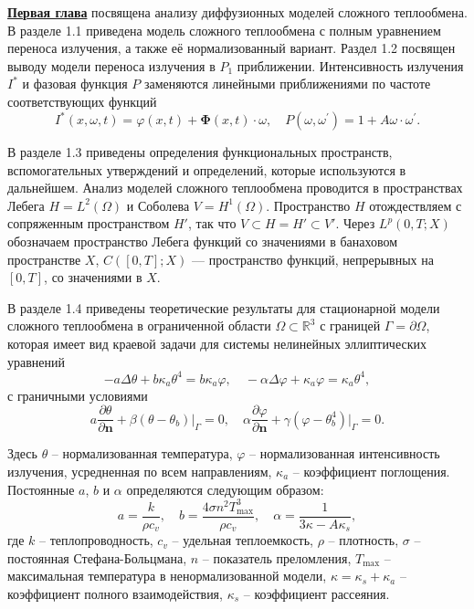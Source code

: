 \underline{\textbf{Первая глава}} посвящена анализу
диффузионных моделей сложного теплообмена.
В разделе 1.1 приведена модель сложного теплообмена с
полным уравнением переноса излучения, а также её нормализованный вариант.
Раздел 1.2 посвящен выводу модели переноса излучения в
$P_1$ приближении.
Интенсивность излучения $I^{*}$ и фазовая функция $P$ заменяются линейными приближениями
по частоте соответствующих функций
\[
    I^{*}(x, \omega, t) = \varphi(x, t)
    +\boldsymbol{\Phi}(x, t) \cdot \omega, \quad
    P\left(\omega, \omega^{\prime}\right)= 1
    + A \omega \cdot \omega^{\prime}.
\]


В разделе 1.3 приведены определения функциональных пространств,
вспомогательных утверждений и определений,
которые используются в дальнейшем.
Анализ моделей сложного теплообмена проводится в пространствах Лебега
$H = L^2(\Omega)$ и Соболева $V = H^1(\Omega)$.
Пространство $H$ отождествляем с сопряженным пространством $H'$,
так что $V \subset H = H' \subset V'$.
Через $L^p(0, T; X)$ обозначаем пространство Лебега функций
со значениями в банаховом пространстве $X$, $C([0, T]; X)$ — пространство
функций, непрерывных на $[0, T]$, со значениями в $X$.


В разделе 1.4 приведены теоретические результаты для
стационарной модели сложного теплообмена
в ограниченной области $\Omega \subset \mathbb{R}^3$ с границей $\Gamma=\partial \Omega$,
которая имеет вид краевой задачи для системы нелинейных эллиптических уравнений
\begin{equation}
    \label{eq:1_4:4-1}
    -a \Delta \theta + b \kappa_a \theta^4 =  b \kappa_a \varphi, \quad
    - \alpha \Delta \varphi + \kappa_a \varphi = \kappa_a \theta^4,
\end{equation}
с граничными условиями
\begin{equation}
    \label{eq:1_4:4-4}
    a \frac{\partial \theta}{\partial \mathbf{n}}
    +\left.\beta\left(\theta-\theta_{b}\right)\right|_{\Gamma}=0, \quad
    \alpha \frac{\partial \varphi}{\partial \mathbf{n}}
    + \gamma (\varphi-\theta_b^4)|_{\Gamma} = 0.
\end{equation}


Здесь $\theta$ -- нормализованная температура, $\varphi$ --
нормализованная интенсивность излучения, усредненная по всем
направлениям, $\kappa_a$ -- коэффициент поглощения.
Постоянные $a$, $b$ и $\alpha$ определяются следующим образом:
\[
    a=\frac{k}{\rho c_v},\quad b = \frac{4\sigma n^2 T_{\max}^3}{\rho c_v},
    \quad \alpha=\frac{1}{3\kappa - A \kappa_s},
\]
где $k$ -- теплопроводность, $c_v$ -- удельная теплоемкость, $\rho$ --
плотность, $\sigma$ -- постоянная Стефана-Больцмана, $n$ --
показатель преломления, $T_{\max}$ -- максимальная температура в
ненормализованной модели, $\kappa = \kappa_s + \kappa_a$ -- коэффициент
полного взаимодействия, $\kappa_s$ -- коэффициент рассеяния.

